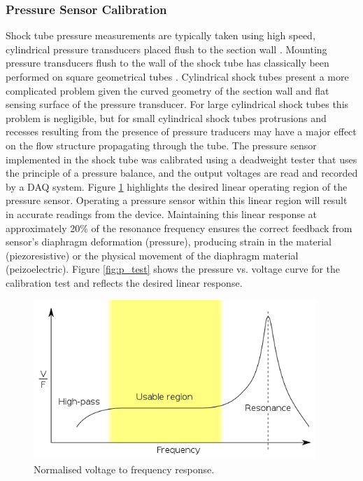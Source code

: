 \subsubsection{Pressure Sensor Calibration}

Shock tube pressure measurements are typically taken using high speed, cylindrical pressure transducers placed flush to the section wall \citep{knight1958piezoelectric}. Mounting pressure transducers flush to the wall of the shock tube has classically been performed on square geometrical tubes \citep{knight1958piezoelectric, anderson2000shock,ryu1995shock}. Cylindrical shock tubes present a more complicated problem given the curved geometry of the section wall and flat sensing surface of the pressure transducer. For large cylindrical shock tubes this problem is negligible, but for small cylindrical shock tubes protrusions and recesses resulting from the presence of pressure traducers may have a major effect on the flow structure propagating through the tube. The pressure sensor implemented in the shock tube was calibrated using a deadweight tester that uses the principle of a pressure balance, and the output voltages are read and recorded by a DAQ system. Figure \ref{fig:volt} highlights the desired linear operating region of the pressure sensor. Operating a pressure sensor within this linear region will result in accurate readings from the device. Maintaining this linear response at approximately 20\% of the resonance frequency ensures the correct feedback from sensor's diaphragm deformation (pressure), producing strain in the material (piezoresistive) or the physical movement of the diaphragm material (peizoelectric). Figure \ref{fig:p_test} shows the pressure vs. voltage curve for the calibration test and reflects the desired linear response. 


\begin{figure}[H] 
	\centering
	\includegraphics[width=0.95\textwidth]{volt.png} 
	\caption{Normalised voltage to frequency response.}
	\label{fig:volt}
\end{figure}

